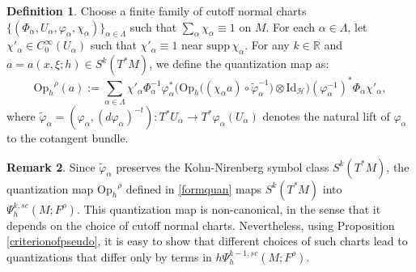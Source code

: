 \documentclass[11pt,oneside,reqno]{amsart}
\newcommand\Oph{\ensuremath{\mathrm{Op}_h}}
\theoremstyle{definition}
\newtheorem{definition}{Definition}[section]
\newtheorem{remark}[definition]{Remark}
\numberwithin{equation}{section}
\theoremstyle{plain}
\begin{document}



\begin{definition}\label{diagofquantizeofscalar}
Choose a finite family of cutoff normal charts $ \{ (\Phi_{\alpha}, U_{\alpha}, \varphi_{\alpha},\chi_{\alpha} ) \}_{\alpha\in \Lambda}$ such that $\sum_{\alpha}\chi_\alpha\equiv 1$ on $M$. For each $\alpha \in \Lambda$, let $\chi'_\alpha\in C_{0}^{\infty}(U_{\alpha})$ such that $\chi'_{\alpha}\equiv 1$ near $\mathrm{supp}\,\chi_{\alpha}$. For any $k \in \mathbb{R}$ and  $a=a(x,\xi;h)\in S^k (T^*M)$, we define the quantization map as:
\begin{equation}\label{formquan}
    \Oph^{\rho}(a):=\sum_{\alpha\in \Lambda} \chi'_{\alpha} \Phi^{-1}_{\alpha} \varphi_{\alpha}^* \big( \mathrm{Op}_h\big( (\chi_{\alpha}a) \circ \widetilde{\varphi}_{\alpha}^{-1}\big)\otimes \mathrm{Id}_{\mathcal{H}} \big)(\varphi_{\alpha}^{-1})^*\Phi_{\alpha} \chi'_{\alpha},
\end{equation}
where $\widetilde{\varphi}_{\alpha}=(\varphi_{\alpha},(d\varphi_{\alpha})^{-t}): T^*U_{\alpha}\to T^*\varphi_{\alpha}(U_{\alpha})$ denotes the natural lift of $\varphi_{\alpha}$ to the cotangent bundle.
\end{definition}
\begin{remark}
    Since $\widetilde{\varphi}_{\alpha}$ preserves the Kohn-Nirenberg symbol class $S^k(T^*M)$, the quantization map $\Oph^{\rho}$ defined in \eqref{formquan} maps $S^k(T^*M)$ into $\Psi^{k,sc}_h(M;F^\rho)$. This quantization map is non-canonical, in the sense that it depends on the choice of cutoff normal charts. Nevertheless, using Proposition \ref{criterionofpseudo}, it is easy to show that different choices of such charts lead to quantizations that differ only by terms in $h\Psi^{k-1,sc}_h(M;F^\rho)$.
\end{remark}


\end{document}
